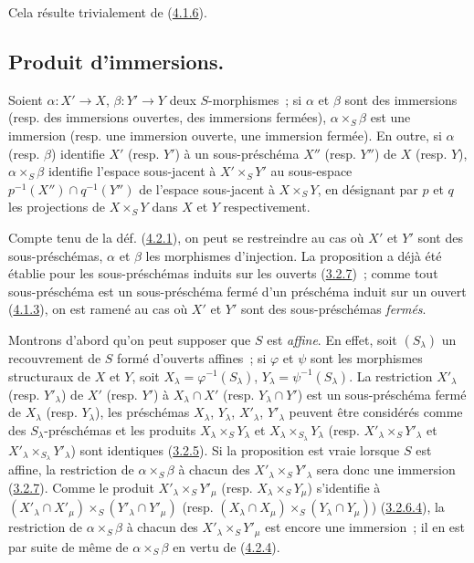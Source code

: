 Cela résulte trivialement de (\hyperref[I.4.1.6-fr]{4.1.6}).

\subsection{Produit d'immersions.}
\label{subsection:I.4.3-fr}

\begin{proposition}[4.3.1]
\label{I.4.3.1-fr}
Soient $\alpha:X'\to X$, $\beta:Y'\to Y$ deux $S$-morphismes~; si $\alpha$ et
$\beta$ sont des immersions (\textup{resp.} des immersions ouvertes, des immersions
fermées), $\alpha\times_S\beta$ est une immersion (\textup{resp.} une immersion ouverte,
une immersion fermée). En outre, si $\alpha$ (\textup{resp.} $\beta$) identifie $X'$
(\textup{resp.} $Y'$) à un sous-préschéma $X''$ (\textup{resp.} $Y''$) de $X$ (\textup{resp.} $Y$),
$\alpha\times_S\beta$ identifie l'espace sous-jacent à $X'\times_S Y'$ au
sous-espace $p^{-1}(X'')\cap q^{-1}(Y'')$ de l'espace sous-jacent à
$X\times_S Y$, en désignant par $p$ et $q$ les projections de $X\times_S Y$
dans $X$ et $Y$ respectivement.
\end{proposition}

Compte tenu de la déf. (\hyperref[I.4.2.1-fr]{4.2.1}), on peut se restreindre
au cas où $X'$ et $Y'$ sont des sous-préschémas, $\alpha$ et $\beta$ les
morphismes d'injection. La proposition a déjà été établie pour les
sous-préschémas induits sur les ouverts (\hyperref[I.3.2.7-fr]{3.2.7})~; comme
tout sous-préschéma est un sous-préschéma fermé d'un préschéma induit sur un
ouvert (\hyperref[I.4.1.3-fr]{4.1.3}), on est ramené au cas où $X'$ et $Y'$ sont
des sous-préschémas \emph{fermés}.

Montrons d'abord qu'on peut supposer que $S$ est \emph{affine}. En effet, soit
$(S_\lambda)$ un recouvrement de $S$ formé d'ouverts affines~; si $\varphi$ et
$\psi$ sont les morphismes structuraux de $X$ et $Y$, soit
$X_\lambda=\varphi^{-1}(S_\lambda)$, $Y_\lambda=\psi^{-1}(S_\lambda)$. La
restriction $X'_\lambda$ (resp. $Y'_\lambda$) de $X'$ (resp. $Y'$) à
$X_\lambda\cap X'$ (resp. $Y_\lambda\cap Y'$) est un sous-préschéma fermé de
$X_\lambda$ (resp. $Y_\lambda$), les préschémas $X_\lambda$, $Y_\lambda$,
$X'_\lambda$, $Y'_\lambda$ peuvent être considérés comme des
$S_\lambda$-préschémas et les produits $X_\lambda\times_S Y_\lambda$ et
$X_\lambda\times_{S_\lambda}Y_\lambda$ (resp.
$X'_\lambda\times_S Y'_\lambda$ et
$X'_\lambda\times_{S_\lambda}Y'_\lambda$) sont identiques
(\hyperref[I.3.2.5-fr]{3.2.5}). Si la proposition est vraie lorsque $S$ est
affine, la restriction de $\alpha\times_S\beta$ à chacun des
$X'_\lambda\times_S Y'_\lambda$ sera donc une immersion
(\hyperref[I.3.2.7-fr]{3.2.7}). Comme le produit
$X'_\lambda\times_S Y'_\mu$ (resp. $X_\lambda\times_S Y_\mu$) s'identifie à
$(X'_\lambda\cap X'_\mu)\times_S(Y'_\lambda\cap Y'_\mu)$ (resp.
$(X_\lambda\cap X_\mu)\times_S(Y_\lambda\cap Y_\mu)$)
(\hyperref[I.3.2.6.4-fr]{3.2.6.4}), la restriction de
$\alpha\times_S\beta$
à chacun des $X'_\lambda\times_S Y'_\mu$ est encore une immersion~; il en est
par suite de même de $\alpha\times_S\beta$ en vertu de
(\hyperref[I.4.2.4-fr]{4.2.4}).

